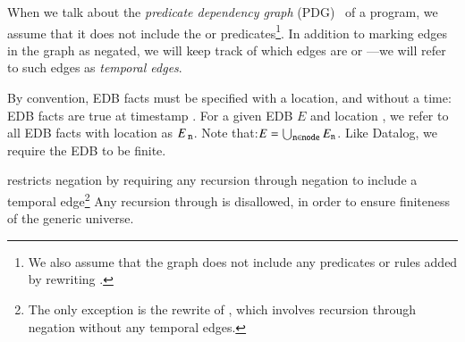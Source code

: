 When we talk about the {\em predicate dependency graph} (PDG)~\cite{ullmanbook} of a \lang program, we assume that it does not include the  or  predicates\footnote{We also assume that the graph does not include any predicates or rules added by rewriting .}.  In addition to marking edges in the graph as negated, we will keep track of which edges are  or ---we will refer to such edges as {\em temporal edges}.


\vspace{1em}
By convention, EDB facts must be specified with a location, and without a time: EDB facts are true at timestamp .  For a given EDB $E$ and location , we refer to all EDB facts with location  as $E_{\text{ \dedalus{{\scriptsize n}}}}$.  Note that:$E = \bigcup_{\text{\dedalus{{\scriptsize n}}} \in \text{\dedalus{{\scriptsize node}}}} E_{\text{\dedalus{{\scriptsize n}}}}$.  Like Datalog, we require the EDB to be finite.

\vspace{1em}
\lang restricts negation by requiring any recursion through negation to include a temporal edge\footnote{The only exception is the rewrite of  , which involves recursion through negation without any temporal edges.}  Any recursion through  is disallowed, in order to ensure finiteness of the generic universe.



